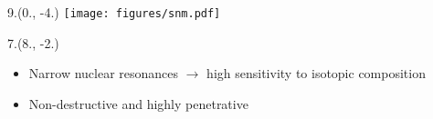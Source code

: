 



\begin{textblock}{9.}(0., -4.)
    \texttt{[image: figures/snm.pdf]}
\end{textblock}

\begin{textblock}{7.}(8., -2.)
    \begin{itemize}
        \item Narrow nuclear resonances $\to$ high sensitivity to isotopic composition
        \item Non-destructive and highly penetrative
    \end{itemize}
\end{textblock}